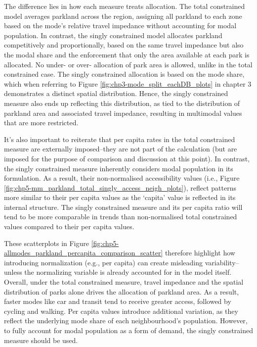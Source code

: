 \documentclass[
11pt, %
oneside, %
english, %
singlespacing, %
]{macthesis} %
\begin{document}
The difference lies in how each measure treats allocation. The total constrained model averages parkland across the region, assigning all parkland to each zone based on the mode's relative travel impedance without accounting for modal population. In contrast, the singly constrained model allocates parkland competitively and proportionally, based on the same travel impedance but also the modal share and the enforcement that only the area available at each park is allocated. No under- or over- allocation of park area is allowed, unlike in the total constrained case. The singly constrained allocation is based on the mode share, which when referring to Figure \ref{fig:chp3-mode_split_eachDB_plots} in chapter 3 demonstrates a distinct spatial distribution. Hence, the singly constrained measure also ends up reflecting this distribution, as tied to the distribution of parkland area and associated travel impedance, resulting in multimodal values that are more restricted.

It's also important to reiterate that per capita rates in the total constrained measure are externally imposed--they are not part of the calculation (but are imposed for the purpose of comparison and discussion at this point). In contrast, the singly constrained measure inherently considers modal population in its formulation. As a result, their non-normalised accessibility values (i.e., Figure\,\ref{fig:chp5-mm_parkland_total_singly_access_neigh_plots}), reflect patterns more similar to their per capita values as the `capita' value is reflected in its internal structure. The singly constrained measure and its per capita ratio will tend to be more comparable in trends than non-normalised total constrained values compared to their per capita values.

These scatterplots in Figure \ref{fig:chp5-allmodes_parkland_percapita_comparison_scatter} therefore highlight how introducing normalization (e.g., per capita) can create misleading variability--unless the normalizing variable is already accounted for in the model itself. Overall, under the total constrained measure, travel impedance and the spatial distribution of parks alone drives the allocation of parkland area. As a result, faster modes like car and transit tend to receive greater access, followed by cycling and walking. Per capita values introduce additional variation, as they reflect the underlying mode share of each neighbourhood's population. However, to fully account for modal population as a form of demand, the singly constrained measure should be used.
\end{document}
